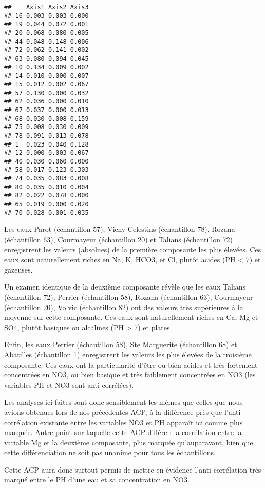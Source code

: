 \documentclass[]{article}
\begin{document}
\begin{verbatim}
##    Axis1 Axis2 Axis3
## 16 0.003 0.003 0.000
## 19 0.044 0.072 0.001
## 20 0.068 0.080 0.005
## 44 0.048 0.148 0.006
## 72 0.062 0.141 0.002
## 63 0.080 0.094 0.045
## 10 0.134 0.009 0.002
## 14 0.010 0.000 0.007
## 15 0.012 0.002 0.067
## 57 0.130 0.000 0.032
## 62 0.036 0.000 0.010
## 67 0.037 0.000 0.013
## 68 0.030 0.008 0.159
## 75 0.008 0.030 0.009
## 78 0.091 0.013 0.078
## 1  0.023 0.040 0.128
## 12 0.000 0.003 0.067
## 40 0.030 0.060 0.000
## 58 0.017 0.123 0.303
## 74 0.035 0.083 0.008
## 80 0.035 0.010 0.004
## 82 0.022 0.078 0.000
## 65 0.019 0.000 0.020
## 70 0.028 0.001 0.035
\end{verbatim}

Les eaux Parot (échantillon 57), Vichy Celestins (échantillon 78),
Rozana (échantillon 63), Courmayeur (échantillon 20) et Talians
(échantillon 72) enregistrent les valeurs (absolues) de la première
composante les plus élevées. Ces eaux sont naturellement riches en Na,
K, HCO3, et Cl, plutôt acides (PH \textless{} 7) et gazeuses.

Un examen identique de la deuxième composante révèle que les eaux
Talians (échantillon 72), Perrier (échantillon 58), Rozana (échantillon
63), Courmayeur (échantillon 20), Volvic (échantillon 82) ont des
valeurs très supérieures à la moyenne sur cette composante. Ces eaux
sont naturellement riches en Ca, Mg et SO4, plutôt basiques ou alcalines
(PH \textgreater{} 7) et plates.

Enfin, les eaux Perrier (échantillon 58), Ste Marguerite (échantillon
68) et Abatilles (échantillon 1) enregistrent les valeurs les plus
élevées de la troisième composante. Ces eaux ont la particularité d'être
ou bien acides et très fortement concentrées en NO3, ou bien basique et
très faiblement concentrées en NO3 (les variables PH et NO3 sont
anti-corrélées).

Les analyses ici faites sont donc sensiblement les mêmes que celles que
nous avions obtenues lors de nos précédentes ACP, à la différence près
que l'anti-corrélation existante entre les variables NO3 et PH apparaît
ici comme plus marquée. Autre point sur laquelle cette ACP diffère : la
corrélation entre la variable Mg et la deuxième composante, plus marquée
qu'auparavant, bien que cette différenciation ne soit pas unanime pour
tous les échantillons.

Cette ACP aura donc surtout permis de mettre en évidence
l'anti-corrélation très marqué entre le PH d'une eau et sa concentration
en NO3.
\end{document}
